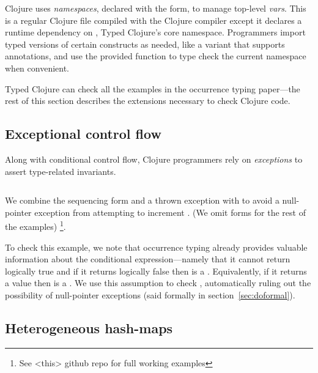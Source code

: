 \begin{exmp}
\inputminted[firstline=1]{clojure}{code/demo/src/demo/eg1.clj}
\end{exmp}

Clojure uses \emph{namespaces}, declared with the
 form, to manage top-level \emph{vars}.
This is a regular Clojure file compiled with
the Clojure compiler except it declares a runtime dependency on
, Typed Clojure's core namespace.
Programmers import typed versions of certain constructs as needed, like
a  variant that supports annotations,
and use the provided  function to type check the current namespace
when convenient.

Typed Clojure can check all the examples in the occurrence typing
paper---the rest of this section describes the extensions necessary
to check Clojure code.

\subsection{Exceptional control flow}

Along with conditional control flow,
Clojure programmers rely on \emph{exceptions}
to assert type-related invariants.

\begin{exmp}
\inputminted[firstline=13,lastline=15]{clojure}{code/demo/src/demo/do.clj}
\end{exmp}

We combine the sequencing form  and a thrown exception with
 to avoid a null-pointer exception from attempting to increment .
(We omit  forms for the rest of the examples)
\footnote{See <this> github repo for full working examples}.

To check this example, we note that
occurrence typing already provides
valuable information about the conditional expression---namely that it cannot return logically true and if it returns logically false 
then  is a . Equivalently, if it returns a value then  is a .
We use this assumption to check , automatically
ruling out the possibility of null-pointer exceptions
(said formally in section~\ref{sec:doformal}).

\subsection{Heterogeneous hash-maps}

